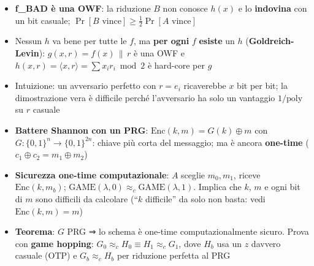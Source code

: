 \begin{itemize}
\tightlist
\item
  \textbf{f\_BAD è una OWF}: la riduzione \(B\) non conosce \(h(x)\) e lo \textbf{indovina} con un bit casuale; \(\Pr[B \text{ vince}] \ge \frac{1}{2} \Pr[A \text{ vince}]\)
\item
  Nessun \(h\) va bene per tutte le \(f\), ma \textbf{per ogni} \(f\) \textbf{esiste} un \(h\) (\textbf{Goldreich-Levin}): \(g(x, r) = f(x) \,\|\, r\) è una OWF e \(h(x, r) = \langle x, r \rangle = \sum x_i r_i \bmod 2\) è hard-core per \(g\)
\item
  Intuizione: un avversario perfetto con \(r = e_i\) ricaverebbe \(x\) bit per bit; la dimostrazione vera è difficile perché l'avversario ha solo un vantaggio \(1/\text{poly}\) su \(r\) casuale
\item
  \textbf{Battere Shannon con un PRG}: \(\text{Enc}(k, m) = G(k) \oplus m\) con \(G : \{0,1\}^n \to \{0,1\}^{2n}\): chiave più corta del messaggio; ma è ancora \textbf{one-time} (\(c_1 \oplus c_2 = m_1 \oplus m_2\))
\item
  \textbf{Sicurezza one-time computazionale}: \(A\) sceglie \(m_0, m_1\), riceve \(\text{Enc}(k, m_b)\); \(\text{GAME}(\lambda, 0) \approx_c \text{GAME}(\lambda, 1)\). Implica che \(k\), \(m\) e ogni bit di \(m\) sono difficili da calcolare (``\(k\) difficile'' da solo non basta: vedi \(\text{Enc}(k, m) = m\))
\item
  \textbf{Teorema}: \(G\) PRG ⇒ lo schema è one-time computazionalmente sicuro. Prova con \textbf{game hopping}: \(G_0 \approx_c H_0 \equiv H_1 \approx_c G_1\), dove \(H_b\) usa un \(z\) davvero casuale (OTP) e \(G_b \approx_c H_b\) per riduzione perfetta al PRG
\end{itemize}
